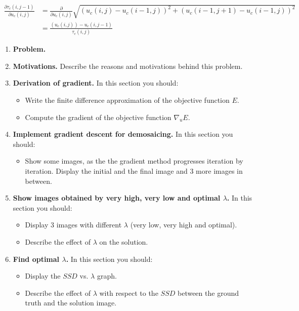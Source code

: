 \documentclass{paper}
\begin{document}
\begin{align}
	\frac{\partial{\tau_{c}\left(i,j-1\right)}}{\partial u_{c}\left(i,j\right)}
	&= \frac{\partial}{\partial{u_{c}\left(i,j\right)}} \sqrt{ \left(u_{c}(i,j) - u_{c}(i-1,j)\right)^2 + \left(u_{c}(i-1,j+1) - u_{c}(i-1,j)\right)^2} \\	
	&= \frac{\left(u_{c}(i,j)\right)-u_{c} \left(i,j-1\right)}{\tau_{c}\left(i,j\right)}
\end{align}



\begin{enumerate}
\item \textbf{Problem.}

\item \textbf{Motivations.} Describe the reasons and motivations behind this problem.
\item \textbf{Derivation of gradient.} In this section you should:

\begin{itemize}
\item Write the finite difference approximation of the objective function $E$.
\item Compute the gradient of the objective function $\nabla_uE$.  
\end{itemize}


\item \textbf{Implement gradient descent for demosaicing.} In this section you should:

\begin{itemize}
\item Show some images, as the the gradient method progresses iteration by iteration. Display the initial and the final image and 3 more images in between.
\end{itemize}

\item \textbf{Show images obtained by very high, very low and optimal $\lambda$.} In this section you should:

\begin{itemize}
\item Display 3 images with different $\lambda$ (very low, very high and optimal).
\item Describe the effect of $\lambda$ on the solution.
\end{itemize}

\item \textbf{ Find optimal $\lambda$.} In this section you should:

\begin{itemize}
\item Display the $SSD$ vs. $\lambda$ graph.
\item Describe the effect of $\lambda$ with respect to the $SSD$ between the ground truth and the solution image.
\end{itemize}


\end{enumerate}


 
\end{document}
